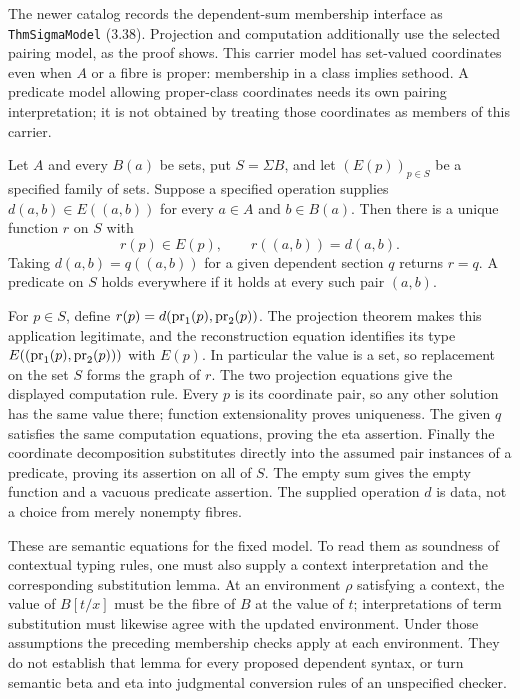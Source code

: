 The newer catalog records the dependent-sum membership interface as
\texttt{ThmSigmaModel} (3.38). Projection and computation additionally
use the selected pairing model, as the proof shows. This carrier model
has set-valued coordinates even when $A$ or a fibre is proper: membership
in a class implies sethood. A predicate model allowing proper-class
coordinates needs its own pairing interpretation; it is not obtained
by treating those coordinates as members of this carrier.

\begin{theorem}
\label{thm:sigma_dependent_elimination}
Let $A$ and every $B(a)$ be sets, put $S=\Sigma B$, and let
$(E(p))_{p\in S}$ be a specified family of sets. Suppose a specified
operation supplies $d(a,b)\in E((a,b))$ for every $a\in A$ and
$b\in B(a)$. Then there is a unique function $r$ on $S$ with
\[
r(p)\in E(p),\qquad r((a,b))=d(a,b).
\]
Taking $d(a,b)=q((a,b))$ for a given dependent section $q$ returns
$r=q$. A predicate on $S$ holds everywhere if it holds at every
such pair $(a,b)$.
\end{theorem}
\Proof
For $p\in S$, define
$r(p)=d(\mathrm{pr}_1(p),\mathrm{pr}_2(p))$.
The projection theorem makes this application legitimate, and the
reconstruction equation identifies its type
$E((\mathrm{pr}_1(p),\mathrm{pr}_2(p)))$ with $E(p)$. In particular the value is
a set, so replacement on the set $S$ forms the graph of $r$.
The two projection equations give the displayed computation rule.
Every $p$ is its coordinate pair, so any other solution has the same
value there; function extensionality proves uniqueness. The given $q$
satisfies the same computation equations, proving the eta assertion.
Finally the coordinate decomposition substitutes directly into the
assumed pair instances of a predicate, proving its assertion on all of
$S$. The empty sum gives the empty function and a vacuous predicate
assertion. The supplied operation $d$ is data, not a choice from
merely nonempty fibres.
\Done

These are semantic equations for the fixed model. To read them as
soundness of contextual typing rules, one must also supply a
context interpretation and the corresponding substitution lemma. At
an environment $\rho$ satisfying a context, the value of $B[t/x]$
must be the fibre of $B$ at the value of $t$; interpretations of term
substitution must likewise agree with the updated environment.
Under those assumptions the preceding membership checks apply at
each environment. They do not establish that lemma for every proposed
dependent syntax, or turn semantic beta and eta into judgmental
conversion rules of an unspecified checker.

